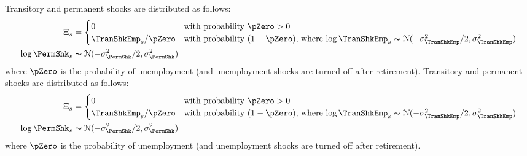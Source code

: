 \documentclass[titlepage, headings=optiontotocandhead]{Resources/texmf-local/tex/latex/econtex}
\begin{document}
  Transitory and permanent shocks are distributed as follows:
  \begin{equation}\begin{gathered}\begin{aligned}
        \Xi_{s} & =
        \begin{cases}
          0\phantom{/\pZero} & \text{with probability $\pZero>0$} \\
          \TranShkEmp_{s}/\pZero      & \text{with probability $(1-\pZero)$, where $\log \TranShkEmp_{s}\thicksim \mathcal{N}(-\sigma_{\TranShkEmp}^{2}/2,\sigma_{\TranShkEmp}^{2})$}\\
        \end{cases}\\
        \log \PermShk_{s} &\thicksim \mathcal{N}(-\sigma_{\PermShk}^{2}/2,\sigma_{\PermShk}^{2})
      \end{aligned}\end{gathered}\end{equation}
  where $\pZero$ is the probability of unemployment (and unemployment shocks are turned off after retirement).
  Transitory and permanent shocks are distributed as follows:
  \begin{equation}\begin{gathered}\begin{aligned}
        \Xi_{s} & =
        \begin{cases}
          0\phantom{/\pZero} & \text{with probability $\pZero>0$} \\
          \TranShkEmp_{s}/\pZero      & \text{with probability $(1-\pZero)$, where $\log \TranShkEmp_{s}\thicksim \mathcal{N}(-\sigma_{\TranShkEmp}^{2}/2,\sigma_{\TranShkEmp}^{2})$}\\
        \end{cases}\\
        \log \PermShk_{s} &\thicksim \mathcal{N}(-\sigma_{\PermShk}^{2}/2,\sigma_{\PermShk}^{2})
      \end{aligned}\end{gathered}\end{equation}
  where $\pZero$ is the probability of unemployment (and unemployment shocks are turned off after retirement).
\end{document}
